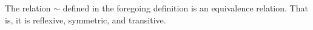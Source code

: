 The relation $\sim$ defined in the foregoing definition is an equivalence relation. That is, it is reflexive, symmetric, and transitive.
